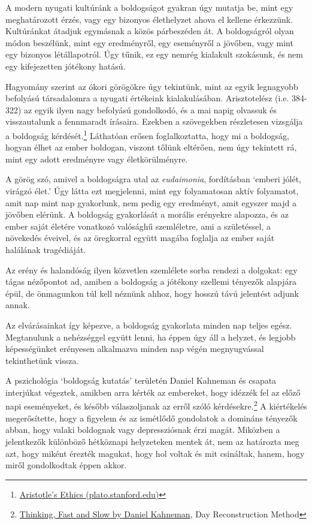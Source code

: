 
\noindent A modern nyugati kultúránk a boldogságot gyakran úgy mutatja
be, mint egy meghatározott érzés, vagy egy bizonyos élethelyzet ahova el
kellene érkezzünk. Kultúránkat átadjuk egymásnak a közös párbeszéden át.
A boldogságról olyan módon beszélünk, mint egy eredményről, egy
eseményről a jövőben, vagy mint egy bizonyos létállapotról. Úgy tűnik,
ez egy nemrég kialakult szokásunk, és nem egy kifejezetten jótékony
hatású.

Hagyomány szerint az ókori görögökre úgy tekintünk, mint az egyik
legnagyobb befolyású társadalomra a nyugati értékeink kialakulásában.
Arisztotelész (i.e. 384-322) az egyik ilyen nagy befolyású gondolkodó,
és a mai napig olvassuk és visszautalunk a fennmaradt írásaira. Ezekben
a szövegekben részletesen vizsgálja a boldogság kérdését.\footnote{\href{https://plato.stanford.edu/entries/aristotle-ethics/}{Aristotle's
  Ethics (plato.stanford.edu)}} Láthatóan erősen foglalkoztatta, hogy mi
a boldogság, hogyan élhet az ember boldogan, viszont tőlünk eltérően,
nem úgy tekintett rá, mint egy adott eredményre vagy életkörülményre.

\enlargethispage*{\baselineskip}

A görög szó, amivel a boldogságra utal az \emph{eudaimonia}, fordításban
`emberi jólét, virágzó élet.' Úgy látta ezt megjelenni, mint egy
folyamatosan aktív folyamatot, amit nap mint nap gyakorlunk, nem pedig
egy eredményt, amit egyszer majd a jövőben elérünk. A boldogság
gyakorlását a morális erényekre alapozza, és az ember saját életére
vonatkozó valósághű szemléletre, ami a születéssel, a növekedés éveivel,
és az öregkorral együtt magába foglalja az ember saját halálának
tragédiáját.

Az erény és halandóság ilyen közvetlen szemlélete sorba rendezi a
dolgokat: egy tágas nézőpontot ad, amiben a boldogság a jótékony
szellemi tényezők alapjára épül, de önmagunkon túl kell néznünk ahhoz,
hogy hosszú távú jelentést adjunk annak.

Az elvárásainkat így képezve, a boldogság gyakorlata minden nap teljes
egész. Megtanulunk a nehézséggel együtt lenni, ha éppen úgy áll a
helyzet, és legjobb képességünket erényesen alkalmazva minden nap végén
megnyugvással tekinthetünk vissza.

A pszichológia `boldogság kutatás' területén Daniel Kahneman és csapata
interjúkat végeztek, amikben arra kérték az embereket, hogy idézzék fel
az előző napi eseményeket, és később válaszoljanak az erről szóló
kérdésekre.\footnote{\href{https://www.goodreads.com/book/show/11468377-thinking-fast-and-slow}{Thinking,
  Fast and Slow by Daniel Kahneman}, Day Reconstruction Method} A
kiértékelés megerősítette, hogy a figyelem és az ismétlődő gondolatok a
domináns tényezők abban, hogy valaki boldognak vagy depressziósnak érzi
magát. Miközben a jelentkezők különböző hétköznapi helyzeteken mentek
át, nem az határozta meg azt, hogy miként érezték magukat, hogy hol
voltak és mit csináltak, hanem, hogy miről gondolkodtak éppen akkor.

